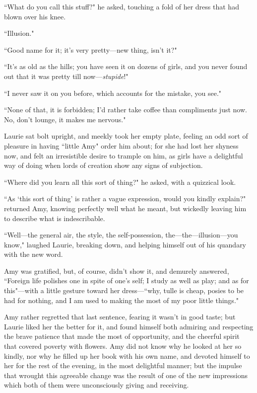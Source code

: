 ``What do you call this stuff?" he asked, touching a fold of her dress
that had blown over his knee.

``Illusion."

``Good name for it; it's very pretty---new thing,
isn't it?"

``It's as old as the hills; you have seen it on dozens of
girls, and you never found out that it was pretty till
now---\emph{stupide}!"

``I never saw it on you before, which accounts for the mistake, you see."

``None of that, it is forbidden; I'd rather take coffee
than compliments just now. No, don't lounge, it makes me
nervous."

Laurie sat bolt upright, and meekly took her empty plate, feeling an odd
sort of pleasure in having ``little Amy" order him about; for she had
lost her shyness now, and felt an irresistible desire to trample on him,
as girls have a delightful way of doing when lords of creation show any
signs of subjection.

``Where did you learn all this sort of thing?" he asked, with a quizzical
look.

``As `this sort of thing' is rather a
vague expression, would you kindly explain?" returned Amy, knowing
perfectly well what he meant, but wickedly leaving him to describe what
is indescribable.

``Well---the general air, the style, the self-possession,
the---the---illusion---you know," laughed Laurie, breaking down, and
helping himself out of his quandary with the new word.

Amy was gratified, but, of course, didn't show it, and
demurely answered, ``Foreign life polishes one in spite of
one's self; I study as well as play; and as for
this"---with a little gesture toward her dress---``why, tulle is cheap,
posies to be had for nothing, and I am used to making the most of my
poor little things."

Amy rather regretted that last sentence, fearing it
wasn't in good taste; but Laurie liked her the better
for it, and found himself both admiring and respecting the brave
patience that made the most of opportunity, and the cheerful spirit that
covered poverty with flowers. Amy did not know why he looked at her so
kindly, nor why he filled up her book with his own name, and devoted
himself to her for the rest of the evening, in the most delightful
manner; but the impulse that wrought this agreeable change was the
result of one of the new impressions which both of them were
unconsciously giving and receiving.
